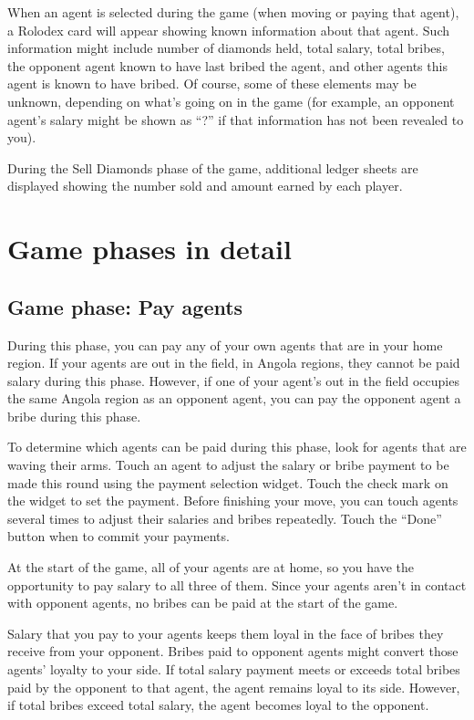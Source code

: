 \documentclass[8pt]{extbook}
\begin{document}
When an agent is selected during the game (when moving or paying that agent), a Rolodex card will appear showing known information about that agent.  Such information might include number of diamonds held, total salary, total bribes, the opponent agent known to have last bribed the agent, and other agents this agent is known to have bribed.  Of course, some of these elements may be unknown, depending on what's going on in the game (for example, an opponent agent's salary might be shown as ``?'' if that information has not been revealed to you).

During the Sell Diamonds phase of the game, additional ledger sheets are displayed showing the number sold and amount earned by each player.





\section{Game phases in detail}

\subsection{Game phase:  Pay agents}
\label{sec:payPhase}

During this phase, you can pay any of your own agents that are in your home region.  If your agents are out in the field, in Angola regions, they cannot be paid salary during this phase.  However, if one of your agent's out in the field occupies the same Angola region as an opponent agent, you can pay the opponent agent a bribe during this phase.

To determine which agents can be paid during this phase, look for agents that are waving their arms.  Touch an agent to adjust the salary or bribe payment to be made this round using the payment selection widget.  Touch the check mark on the widget to set the payment.  Before finishing your move, you can touch agents several times to adjust their salaries and bribes repeatedly.  Touch the ``Done'' button when to commit your payments. 

At the start of the game, all of your agents are at home, so you have the opportunity to pay salary to all three of them.  Since your agents aren't in contact with opponent agents, no bribes can be paid at the start of the game.

Salary that you pay to your agents keeps them loyal in the face of bribes they receive from your opponent.  Bribes paid to opponent agents might convert those agents' loyalty to your side.  If total salary payment meets or exceeds total bribes paid by the opponent to that agent, the agent remains loyal to its side.  However, if total bribes exceed total salary, the agent becomes loyal to the opponent.
\end{document}
